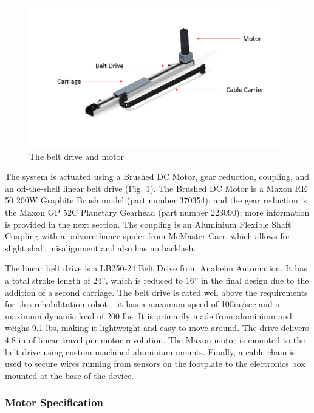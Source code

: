 \documentclass[12pt]{report}
\begin{document}
	\begin{figure}[h] 
		\centering
		\includegraphics[width=\linewidth]{actuator}
		\caption{The belt drive and motor}
		\label{fig:actuator}
	\end{figure}
		
		
	The system is actuated using a Brushed DC Motor, gear reduction, coupling, and an off-the-shelf linear belt drive (Fig. \ref{fig:actuator}). The Brushed DC Motor is a Maxon RE 50 200W Graphite Brush model (part number 370354), and the gear reduction is the Maxon GP 52C Planetary Gearhead (part number 223090); more information is provided in the next section. The coupling is an Aluminium Flexible Shaft Coupling with a polyurethance spider from McMaster-Carr, which allows for slight shaft misalignment and also has no backlash. 
	
	The linear belt drive is a LB250-24 Belt Drive from Anaheim Automation. It has a total stroke length of 24'', which is reduced to 16'' in the final design due to the addition of a second carriage. The belt drive is rated well above the requirements for this rehabilitation robot -- it has a maximum speed of 100in/sec and a maximum dynamic load of 200 lbs. It is primarily made from aluminium and weighs 9.1 lbs, making it lightweight and easy to move around. The drive delivers 4.8 in of linear travel per motor revolution. The Maxon motor is mounted to the belt drive using custom machined aluminium mounts. Finally, a cable chain is used to secure wires running from sensors on the footplate to the electronics box mounted at the base of the device. 
	
	

	\subsubsection{Motor Specification}
	
\end{document}
